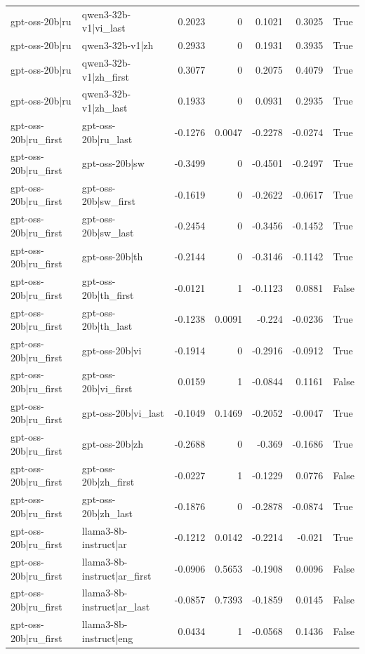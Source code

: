 \begin{table}
\begin{tabular}{l l r r r r l}
gpt-oss-20b|ru & qwen3-32b-v1|vi_last & 0.2023 & 0 & 0.1021 & 0.3025 & True \\
gpt-oss-20b|ru & qwen3-32b-v1|zh & 0.2933 & 0 & 0.1931 & 0.3935 & True \\
gpt-oss-20b|ru & qwen3-32b-v1|zh_first & 0.3077 & 0 & 0.2075 & 0.4079 & True \\
gpt-oss-20b|ru & qwen3-32b-v1|zh_last & 0.1933 & 0 & 0.0931 & 0.2935 & True \\
gpt-oss-20b|ru_first & gpt-oss-20b|ru_last & -0.1276 & 0.0047 & -0.2278 & -0.0274 & True \\
gpt-oss-20b|ru_first & gpt-oss-20b|sw & -0.3499 & 0 & -0.4501 & -0.2497 & True \\
gpt-oss-20b|ru_first & gpt-oss-20b|sw_first & -0.1619 & 0 & -0.2622 & -0.0617 & True \\
gpt-oss-20b|ru_first & gpt-oss-20b|sw_last & -0.2454 & 0 & -0.3456 & -0.1452 & True \\
gpt-oss-20b|ru_first & gpt-oss-20b|th & -0.2144 & 0 & -0.3146 & -0.1142 & True \\
gpt-oss-20b|ru_first & gpt-oss-20b|th_first & -0.0121 & 1 & -0.1123 & 0.0881 & False \\
gpt-oss-20b|ru_first & gpt-oss-20b|th_last & -0.1238 & 0.0091 & -0.224 & -0.0236 & True \\
gpt-oss-20b|ru_first & gpt-oss-20b|vi & -0.1914 & 0 & -0.2916 & -0.0912 & True \\
gpt-oss-20b|ru_first & gpt-oss-20b|vi_first & 0.0159 & 1 & -0.0844 & 0.1161 & False \\
gpt-oss-20b|ru_first & gpt-oss-20b|vi_last & -0.1049 & 0.1469 & -0.2052 & -0.0047 & True \\
gpt-oss-20b|ru_first & gpt-oss-20b|zh & -0.2688 & 0 & -0.369 & -0.1686 & True \\
gpt-oss-20b|ru_first & gpt-oss-20b|zh_first & -0.0227 & 1 & -0.1229 & 0.0776 & False \\
gpt-oss-20b|ru_first & gpt-oss-20b|zh_last & -0.1876 & 0 & -0.2878 & -0.0874 & True \\
gpt-oss-20b|ru_first & llama3-8b-instruct|ar & -0.1212 & 0.0142 & -0.2214 & -0.021 & True \\
gpt-oss-20b|ru_first & llama3-8b-instruct|ar_first & -0.0906 & 0.5653 & -0.1908 & 0.0096 & False \\
gpt-oss-20b|ru_first & llama3-8b-instruct|ar_last & -0.0857 & 0.7393 & -0.1859 & 0.0145 & False \\
gpt-oss-20b|ru_first & llama3-8b-instruct|eng & 0.0434 & 1 & -0.0568 & 0.1436 & False \\

\end{tabular}
\end{table}
